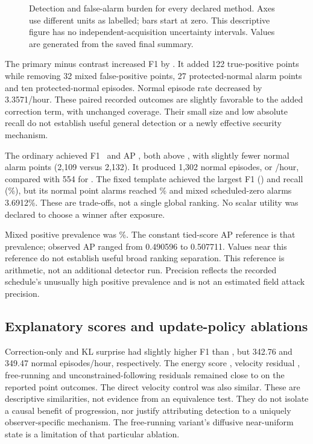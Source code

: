 \begin{figure}[htbp]\centering

\caption{Detection and false-alarm burden for every declared method. Axes use different units as labelled; bars start at zero. This descriptive figure has no independent-acquisition uncertainty intervals. Values are generated from the saved final summary.}\label{fig:tradeoffs}
\end{figure}

The primary  minus  contrast increased F1 by \FoneGain. It added 122 true-positive points while removing 32 mixed false-positive points, 27 protected-normal alarm points and ten protected-normal episodes. Normal episode rate decreased by 3.3571/hour. These paired recorded outcomes are slightly favorable to the added correction term, with unchanged coverage. Their small size and low absolute recall do not establish useful general detection or a newly effective security mechanism.

The ordinary  achieved F1 \ARFone\ and AP \ARAP, both above , with slightly fewer normal alarm points (2,109 versus 2,132). It produced 1,302 normal episodes, or \AREpisodeRate/hour, compared with 554 for . The fixed template  achieved the largest F1 (\TemplateFone) and recall (\TemplateRecallPct\%), but its normal point alarms reached \TemplateNormalPct\% and mixed scheduled-zero alarms 3.6912\%. These are trade-offs, not a single global ranking. No scalar utility was declared to choose a winner after exposure.

Mixed positive prevalence was \PrevalencePct\%. The constant tied-score AP reference is that prevalence; observed AP ranged from 0.490596 to 0.507711. Values near this reference do not establish useful broad ranking separation. This reference is arithmetic, not an additional detector run. Precision reflects the recorded schedule's unusually high positive prevalence and is not an estimated field attack precision.

\subsection{Explanatory scores and update-policy ablations}
Correction-only  and KL surprise  had slightly higher F1 than , but 342.76 and 349.47 normal episodes/hour, respectively. The energy score , velocity residual , free-running and unconstrained-following residuals remained close to  on the reported point outcomes. The direct velocity control was also similar. These are descriptive similarities, not evidence from an equivalence test. They do not isolate a causal benefit of progression, nor justify attributing detection to a uniquely observer-specific mechanism. The free-running variant's diffusive near-uniform state is a limitation of that particular ablation.

